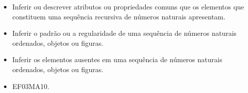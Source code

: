 
\begin{itemize}
\item Inferir ou descrever atributos ou propriedades comuns que os elementos
que constituem uma sequência recursiva de números naturais apresentam.

\item Inferir o padrão ou a regularidade de uma sequência de números
naturais ordenados, objetos ou figuras.

\item Inferir os elementos ausentes em uma sequência de números naturais
ordenados, objetos ou figuras.
\end{itemize}


\begin{itemize}
\item EF03MA10.
\end{itemize}


